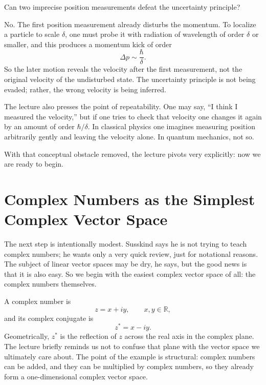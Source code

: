 Can two imprecise position measurements defeat the uncertainty principle?

No. The first position measurement already disturbs the momentum. To localize a particle to scale \(\delta\), one must probe it with radiation of wavelength of order \(\delta\) or smaller, and this produces a momentum kick of order
\begin{equation}
\Delta p \sim \frac{\hbar}{\delta}.
\end{equation}
So the later motion reveals the velocity after the first measurement, not the original velocity of the undisturbed state. The uncertainty principle is not being evaded; rather, the wrong velocity is being inferred.

The lecture also presses the point of repeatability. One may say, ``I think I measured the velocity,'' but if one tries to check that velocity one changes it again by an amount of order \(\hbar/\delta\). In classical physics one imagines measuring position arbitrarily gently and leaving the velocity alone. In quantum mechanics, not so.

With that conceptual obstacle removed, the lecture pivots very explicitly: now we are ready to begin.

\section{Complex Numbers as the Simplest Complex Vector Space}

The next step is intentionally modest. Susskind says he is not trying to teach complex numbers; he wants only a very quick review, just for notational reasons. The subject of linear vector spaces may be dry, he says, but the good news is that it is also easy. So we begin with the easiest complex vector space of all: the complex numbers themselves.

A complex number is
\begin{equation}
z = x + i y,
\qquad x,y \in \mathbb{R},
\end{equation}
and its complex conjugate is
\begin{equation}
z^* = x - i y.
\end{equation}
Geometrically, \(z^*\) is the reflection of \(z\) across the real axis in the complex plane. The lecture briefly reminds us not to confuse that plane with the vector space we ultimately care about. The point of the example is structural: complex numbers can be added, and they can be multiplied by complex numbers, so they already form a one-dimensional complex vector space.

